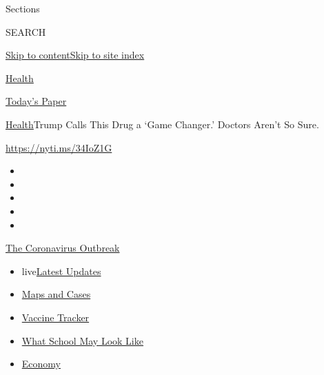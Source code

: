Sections

SEARCH

\protect\hyperlink{site-content}{Skip to
content}\protect\hyperlink{site-index}{Skip to site index}

\href{https://www.nytimes3xbfgragh.onion/section/health}{Health}

\href{https://myaccount.nytimes3xbfgragh.onion/auth/login?response_type=cookie\&client_id=vi}{}

\href{https://www.nytimes3xbfgragh.onion/section/todayspaper}{Today's
Paper}

\href{/section/health}{Health}\textbar{}Trump Calls This Drug a `Game
Changer.' Doctors Aren't So Sure.

\url{https://nyti.ms/34IoZ1G}

\begin{itemize}
\item
\item
\item
\item
\item
\end{itemize}

\href{https://www.nytimes3xbfgragh.onion/news-event/coronavirus?action=click\&pgtype=Article\&state=default\&region=TOP_BANNER\&context=storylines_menu}{The
Coronavirus Outbreak}

\begin{itemize}
\tightlist
\item
  live\href{https://www.nytimes3xbfgragh.onion/2020/08/01/world/coronavirus-covid-19.html?action=click\&pgtype=Article\&state=default\&region=TOP_BANNER\&context=storylines_menu}{Latest
  Updates}
\item
  \href{https://www.nytimes3xbfgragh.onion/interactive/2020/us/coronavirus-us-cases.html?action=click\&pgtype=Article\&state=default\&region=TOP_BANNER\&context=storylines_menu}{Maps
  and Cases}
\item
  \href{https://www.nytimes3xbfgragh.onion/interactive/2020/science/coronavirus-vaccine-tracker.html?action=click\&pgtype=Article\&state=default\&region=TOP_BANNER\&context=storylines_menu}{Vaccine
  Tracker}
\item
  \href{https://www.nytimes3xbfgragh.onion/interactive/2020/07/29/us/schools-reopening-coronavirus.html?action=click\&pgtype=Article\&state=default\&region=TOP_BANNER\&context=storylines_menu}{What
  School May Look Like}
\item
  \href{https://www.nytimes3xbfgragh.onion/live/2020/07/31/business/stock-market-today-coronavirus?action=click\&pgtype=Article\&state=default\&region=TOP_BANNER\&context=storylines_menu}{Economy}
\end{itemize}

